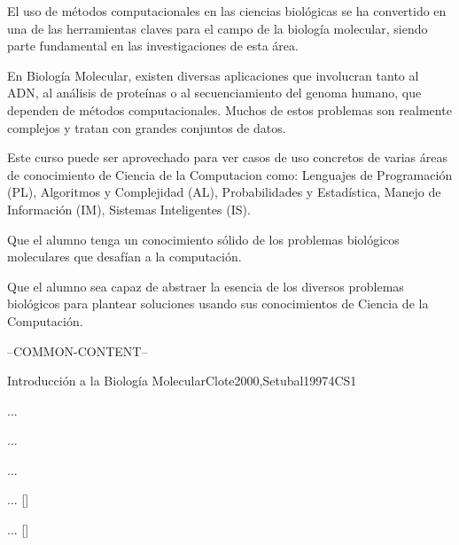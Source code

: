 \begin{syllabus}


\begin{justification}
El uso de métodos computacionales en las ciencias biológicas se ha convertido en una de las herramientas claves para el campo de la biología molecular, siendo parte fundamental en las investigaciones de esta área. 

En Biología Molecular, existen diversas aplicaciones que involucran tanto al ADN, al análisis de proteínas o al secuenciamiento del genoma humano, que dependen de métodos computacionales. Muchos de estos problemas son realmente complejos y tratan con grandes conjuntos de datos. 

Este curso puede ser aprovechado para ver casos de uso concretos de varias áreas de conocimiento de Ciencia de la Computacion como: Lenguajes de Programación (PL), Algoritmos y Complejidad (AL), Probabilidades y Estadística, Manejo de Información (IM), Sistemas Inteligentes (IS).
\end{justification}
	
\begin{goals}
\item Que el alumno tenga un conocimiento sólido de los problemas biológicos moleculares que desafían a la computación.
\item Que el alumno sea capaz de abstraer la esencia de los diversos problemas biológicos para plantear soluciones usando sus conocimientos de Ciencia de la Computación.
\end{goals}
	
--COMMON-CONTENT--

\begin{unit}{Introducción a la Biología Molecular}{}{Clote2000,Setubal1997}{4}{CS1}
\begin{topics}
	\item ... 
	\item ...
	\item ...
\end{topics}
\begin{learningoutcomes}
	\item ... [\Familiarity]
	\item ... [\Assessment]
\end{learningoutcomes}
\end{unit}

\begin{coursebibliography}
\end{coursebibliography}

\end{syllabus}
	